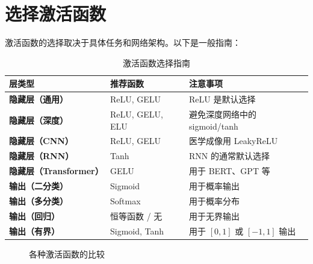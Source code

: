 \section{选择激活函数}

激活函数的选择取决于具体任务和网络架构。以下是一般指南：

\begin{table}[ht]
    \centering
    \caption{激活函数选择指南}
    \begin{tabular}{L{3cm} L{5cm} L{4cm}}
        \toprule
        \textbf{层类型} & \textbf{推荐函数} & \textbf{注意事项} \\
        \midrule
        \textbf{隐藏层（通用）} & ReLU, GELU & ReLU 是默认选择 \\
        \textbf{隐藏层（深度）} & ReLU, GELU, ELU & 避免深度网络中的 sigmoid/tanh \\
        \textbf{隐藏层（CNN）} & ReLU, GELU & 医学成像用 LeakyReLU \\
        \textbf{隐藏层（RNN）} & Tanh & RNN 的通常默认选择 \\
        \textbf{隐藏层（Transformer）} & GELU & 用于 BERT、GPT 等 \\
        \textbf{输出（二分类）} & Sigmoid & 用于概率输出 \\
        \textbf{输出（多分类）} & Softmax & 用于概率分布 \\
        \textbf{输出（回归）} & 恒等函数 / 无 & 用于无界输出 \\
        \textbf{输出（有界）} & Sigmoid, Tanh & 用于 $[0,1]$ 或 $[-1,1]$ 输出 \\
        \bottomrule
    \end{tabular}
\end{table}

\begin{figure}[htbp]
    \centering
    \caption[各种激活函数比较]{各种激活函数的比较}
    \label{fig:activation_comparison}
\end{figure}

